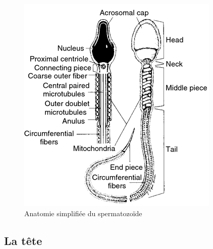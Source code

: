 \documentclass[12pt,twoside]{ugathesis}
\theoremstyle{definition}
\theoremstyle{definition}
\theoremstyle{remark}
\begin{document}
\begin{figure}

{\centering \includegraphics[scale=.75]{figure/sperm_anatomy} 

}

\caption[Anatomie simplifiée du spermatozoïde]{Anatomie simplifiée du spermatozoïde}\label{fig:spz}
\end{figure}

\newpage

\subsection{La tête}\label{la-tete}
\end{document}
